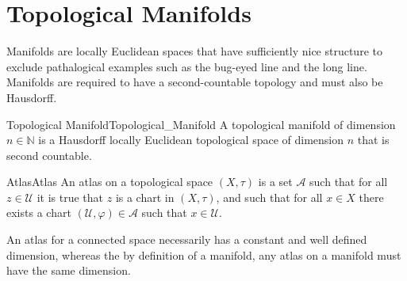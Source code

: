 \documentclass{article}                                                        %
\begin{document}
    \section{Topological Manifolds}
        Manifolds are locally Euclidean spaces that have sufficiently nice
        structure to exclude pathalogical examples such as the bug-eyed line
        and the long line. Manifolds are required to have a second-countable
        topology and must also be Hausdorff.
        \begin{fdefinition}{Topological Manifold}{Topological_Manifold}
            A topological manifold of dimension $n\in\mathbb{N}$ is a
            Hausdorff locally Euclidean topological space of dimension $n$
            that is second countable.
        \end{fdefinition}
        \begin{fdefinition}{Atlas}{Atlas}
            An atlas on a topological space $(X,\tau)$ is a set
            $\mathcal{A}$ such that for all $z\in\mathcal{U}$ it is true
            that $z$ is a chart in $(X,\tau)$, and such that for all
            $x\in{X}$ there exists a chart
            $(\mathcal{U},\varphi)\in\mathcal{A}$ such that
            $x\in\mathcal{U}$.
        \end{fdefinition}
        An atlas for a connected space necessarily has a constant and well
        defined dimension, whereas the by definition of a manifold, any
        atlas on a manifold must have the same dimension.
\end{document}

